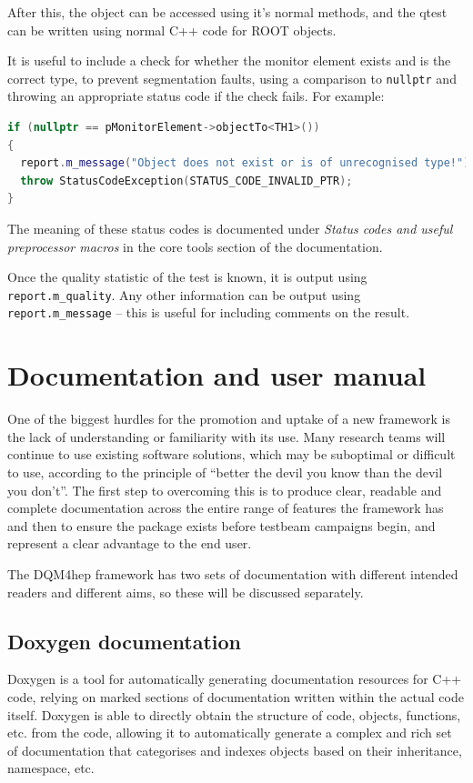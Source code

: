 After this, the object can be accessed using it's normal methods, and the \acrshort{qtest} can be written using normal C++ code for ROOT objects.

It is useful to include a check for whether the monitor element exists and is the correct type, to prevent segmentation faults, using a comparison to \texttt{nullptr} and throwing an appropriate status code if the check fails. For example:

\begin{lstlisting}[language=C++]
if (nullptr == pMonitorElement->objectTo<TH1>())
{
  report.m_message("Object does not exist or is of unrecognised type!");
  throw StatusCodeException(STATUS_CODE_INVALID_PTR);
}
\end{lstlisting}

The meaning of these status codes is documented under \textit{Status codes and useful preprocessor macros} in the core tools section of the documentation.

Once the quality statistic of the test is known, it is output using \texttt{report.m\_quality}. Any other information can be output using \texttt{report.m\_message} – this is useful for including comments on the result.

\section{Documentation and user manual} 
One of the biggest hurdles for the promotion and uptake of a new framework is the lack of understanding or familiarity with its use. Many research teams will continue to use existing software solutions, which may be suboptimal or difficult to use, according to the principle of ``better the devil you know than the devil you don't''. The first step to overcoming this is to produce clear, readable and complete documentation across the entire range of features the framework has and then to ensure the package exists before testbeam campaigns begin, and represent a clear advantage to the end user.

The \acrshort{DQM4hep} framework has two sets of documentation with different intended readers and different aims, so these will be discussed separately.

\subsection{Doxygen documentation}
Doxygen is a tool for automatically generating documentation resources for C++ code, relying on marked sections of documentation written within the actual code itself. Doxygen is able to directly obtain the structure of code, objects, functions, etc. from the code, allowing it to automatically generate a complex and rich set of documentation that categorises and indexes objects based on their inheritance, namespace, etc.

